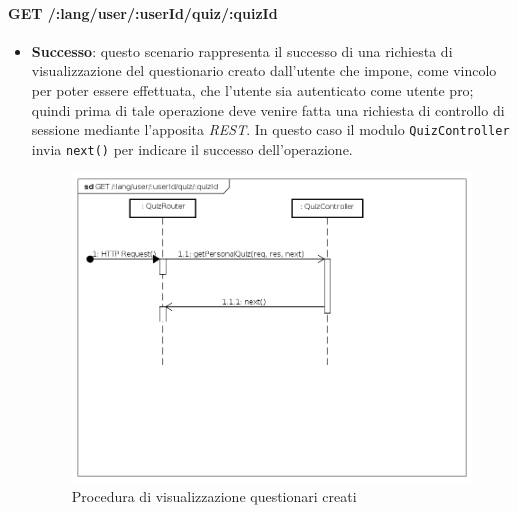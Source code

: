 \paragraph{GET /:lang/user/:userId/quiz/:quizId} %
\begin{itemize}
\item \textbf{Successo}: questo scenario rappresenta il successo di una richiesta di visualizzazione del questionario creato dall'utente che impone, come vincolo per poter essere effettuata, che l'utente sia autenticato come utente pro; quindi prima di tale operazione deve venire fatta una richiesta di controllo di sessione mediante l'apposita \textit{REST}. In questo caso il modulo \texttt{QuizController} invia \texttt{next()} per indicare il successo dell'operazione.
\label{Procedura di visualizzazione questionario creato}
\begin{figure}[ht]
	\centering
	\includegraphics[scale=0.40]{UML/DiagrammiDiSequenza/Back-end/GET__lang_user_userId_quiz_quizId_success.png}
	\caption{Procedura di visualizzazione questionari creati}
\end{figure}
\FloatBarrier


\end{itemize}
